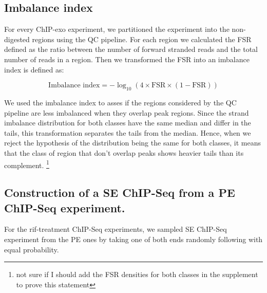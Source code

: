 \documentclass{bmcart}\usepackage[]{graphicx}\usepackage[]{color}
\begin{document}
\subsection*{Imbalance index}

For every ChIP-exo experiment, we partitioned the experiment into the
non-digested regions using the QC pipeline. For each region we
calculated the FSR defined as the ratio between the number of forward
stranded reads and the total number of reads in a region. Then we
transformed the FSR into an imbalance index is defined as:

\[
\mbox{Imbalance index} = -\log_{10} (4 \times \mbox{FSR} \times (1 - \mbox{FSR}))
\]

We used the imbalance index to asses if the regions considered by the
QC pipeline are less imbalanced when they overlap peak regions. Since
the strand imbalance distribution for both classes have the same
median and differ in the tails, this transformation separates the
tails from the median. Hence, when we reject the hypothesis of the
distribution being the same for both classes, it means that the class
of region that don't overlap peaks shows heavier tails than its
complement. \footnote{not sure if I should add the FSR densities for
  both classes in the supplement to prove this statement}






\subsection*{Construction of a SE ChIP-Seq from a PE ChIP-Seq experiment.}

For the rif-treatment ChIP-Seq experiments, we sampled SE ChIP-Seq
experiment from the PE ones by taking one of both ends randomly
following with equal probability.
\end{document}
